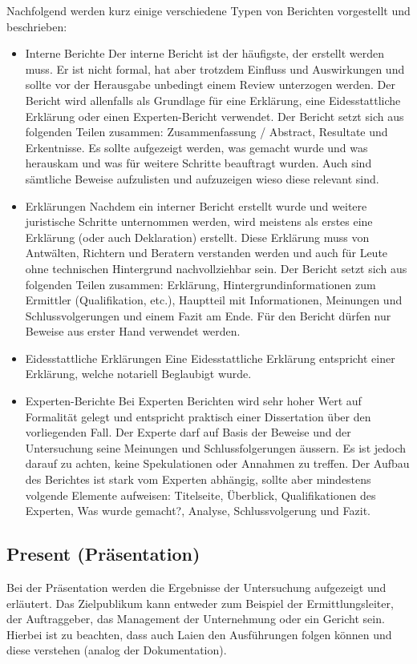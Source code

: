 Nachfolgend werden kurz einige verschiedene Typen von Berichten vorgestellt und beschrieben:

\begin{itemize}
\item Interne Berichte
Der interne Bericht ist der häufigste, der erstellt werden muss. Er ist nicht formal, hat aber trotzdem Einfluss und Auswirkungen und sollte vor der Herausgabe unbedingt einem Review unterzogen werden. Der Bericht wird allenfalls als Grundlage für eine Erklärung, eine Eidesstattliche Erklärung oder einen Experten-Bericht verwendet. Der Bericht setzt sich aus folgenden Teilen zusammen: Zusammenfassung / Abstract, Resultate und Erkentnisse. Es sollte aufgezeigt werden, was gemacht wurde und was herauskam und was für weitere Schritte beauftragt wurden. Auch sind sämtliche Beweise aufzulisten und aufzuzeigen wieso diese relevant sind.
\item Erklärungen
Nachdem ein interner Bericht erstellt wurde und weitere juristische Schritte unternommen werden, wird meistens als erstes eine Erklärung (oder auch Deklaration) erstellt. Diese Erklärung muss von Antwälten, Richtern und Beratern verstanden werden und auch für Leute ohne technischen Hintergrund nachvollziehbar sein. Der Bericht setzt sich aus folgenden Teilen zusammen: Erklärung, Hintergrundinformationen zum Ermittler (Qualifikation, etc.), Hauptteil mit Informationen, Meinungen und Schlussvolgerungen und einem Fazit am Ende. Für den Bericht dürfen nur Beweise aus erster Hand verwendet werden.
\item Eidesstattliche Erklärungen
Eine Eidesstattliche Erklärung entspricht einer Erklärung, welche notariell Beglaubigt wurde.
\item Experten-Berichte
Bei Experten Berichten wird sehr hoher Wert auf Formalität gelegt und entspricht praktisch einer Dissertation über den vorliegenden Fall. Der Experte darf auf Basis der Beweise und der Untersuchung seine Meinungen und Schlussfolgerungen äussern. Es ist jedoch darauf zu achten, keine Spekulationen oder Annahmen zu treffen. Der Aufbau des Berichtes ist stark vom Experten abhängig, sollte aber mindestens volgende Elemente aufweisen: Titelseite, Überblick, Qualifikationen des Experten, Was wurde gemacht?, Analyse, Schlussvolgerung und Fazit.
\end{itemize}

\subsection{Present (Präsentation)}
Bei der Präsentation werden die Ergebnisse der Untersuchung aufgezeigt und erläutert. Das Zielpublikum kann entweder zum Beispiel der Ermittlungsleiter, der Auftraggeber, das Management der Unternehmung oder ein Gericht sein. Hierbei ist zu beachten, dass auch Laien den Ausführungen folgen können und diese verstehen (analog der Dokumentation).

